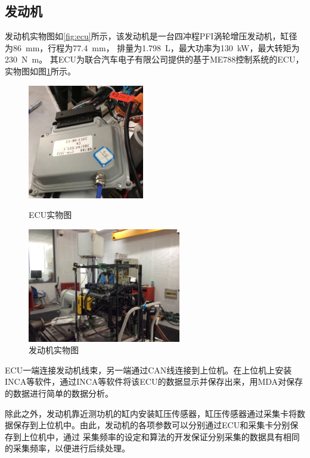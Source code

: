 \subsection{发动机}
发动机实物图如\ref{fig:ecu}所示，该发动机是一台四冲程PFI涡轮增压发动机，缸径为\SI{86}{\mm}，行程为\SI{77.4}{\mm}，
排量为\SI{1.798}{L}，最大功率为\SI{130}{\kW}，最大转矩为\SI{230}{\N\m}。
其ECU为联合汽车电子有限公司提供的基于ME788控制系统的ECU，实物图如图\ref{fig:ice}所示。\par
\begin{figure}[!ht]
	\begin{minipage}[h]{0.5\linewidth}
		\centering
		\includegraphics[height=5cm]{thesis_figure/platformer_chapter/ecu}
		\caption{ECU实物图}
		\label{fig:ecu}
	\end{minipage}
	\begin{minipage}[h]{0.5\linewidth}
		\centering
		\includegraphics[height=5cm]{thesis_figure/platformer_chapter/ice}
		\caption{发动机实物图}
		\label{fig:ice}
	\end{minipage}
\end{figure}
ECU一端连接发动机线束，另一端通过CAN线连接到上位机。在上位机上安装INCA等软件，通过INCA等软件将该ECU的数据显示并保存出来，用MDA对保存的数据进行简单的数据分析。\par
除此之外，发动机靠近测功机的缸内安装缸压传感器，缸压传感器通过采集卡将数据保存到上位机中。由此，发动机的各项参数可以分别通过ECU和采集卡分别保存到上位机中，通过
采集频率的设定和算法的开发保证分别采集的数据具有相同的采集频率，以便进行后续处理。
